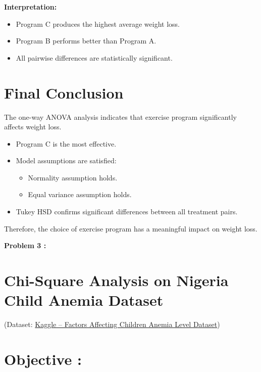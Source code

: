 \documentclass[
]{article}
\begin{document}
\textbf{Interpretation:}

\begin{itemize}
\item
  Program C produces the highest average weight loss.
\item
  Program B performs better than Program A.
\item
  All pairwise differences are statistically significant.
\end{itemize}

\section{Final Conclusion}\label{final-conclusion-1}

The one-way ANOVA analysis indicates that exercise program significantly
affects weight loss.

\begin{itemize}
\item
  Program C is the most effective.
\item
  Model assumptions are satisfied:

  \begin{itemize}
  \item
    Normality assumption holds.
  \item
    Equal variance assumption holds.
  \end{itemize}
\item
  Tukey HSD confirms significant differences between all treatment
  pairs.
\end{itemize}

Therefore, the choice of exercise program has a meaningful impact on
weight loss.

\textbf{Problem 3 :}

\section{Chi-Square Analysis on Nigeria Child Anemia
Dataset}\label{chi-square-analysis-on-nigeria-child-anemia-dataset}

(Dataset:
\href{https://www.kaggle.com/datasets/adeolaadesina/factors-affecting-children-anemia-level/data?utm_source=chatgpt.com}{Kaggle
-- Factors Affecting Children Anemia Level Dataset})

\section{Objective :}\label{objective}
\end{document}
